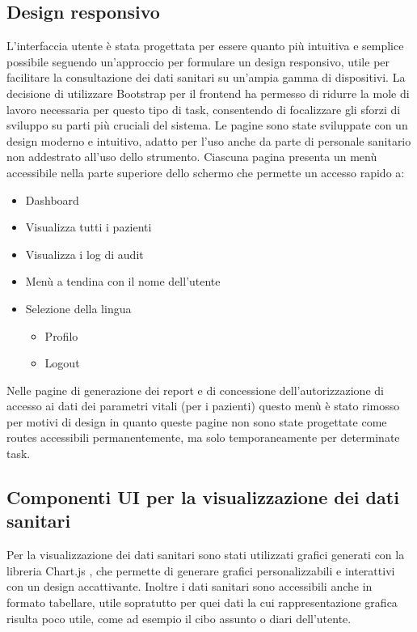 \documentclass[12pt,a4paper,oneside]{report}
\begin{document}
\subsection{Design responsivo}
L'interfaccia utente è stata progettata per essere quanto più intuitiva e semplice possibile seguendo un'approccio per formulare un design responsivo, utile per facilitare la consultazione dei dati sanitari su un'ampia gamma di dispositivi.
La decisione di utilizzare Bootstrap per il frontend ha permesso di ridurre la mole di lavoro necessaria per questo tipo di task, consentendo di focalizzare gli sforzi di sviluppo su parti più cruciali del sistema.
Le pagine sono state sviluppate con un design moderno e intuitivo, adatto per l'uso anche da parte di personale sanitario non addestrato all'uso dello strumento.
Ciascuna pagina presenta un menù accessibile nella parte superiore dello schermo che permette un accesso rapido a:
\begin{itemize}
    \item Dashboard
    \item Visualizza tutti i pazienti
    \item Visualizza i log di audit
    \item Menù a tendina con il nome dell'utente
    \item Selezione della lingua
          \begin{itemize}
              \item Profilo
              \item Logout
          \end{itemize}
\end{itemize}
Nelle pagine di generazione dei report e di concessione dell'autorizzazione di accesso ai dati dei parametri vitali (per i pazienti) questo menù è stato rimosso per motivi di design in quanto queste pagine non sono state progettate come routes accessibili permanentemente, ma solo temporaneamente per determinate task.
\subsection{Componenti UI per la visualizzazione dei dati sanitari}
Per la visualizzazione dei dati sanitari sono stati utilizzati grafici generati con la libreria Chart.js \cite{chartjs}, che permette di generare grafici personalizzabili e interattivi con un design accattivante.
Inoltre i dati sanitari sono accessibili anche in formato tabellare, utile sopratutto per quei dati la cui rappresentazione grafica risulta poco utile, come ad esempio il cibo assunto o diari dell'utente.
\end{document}
